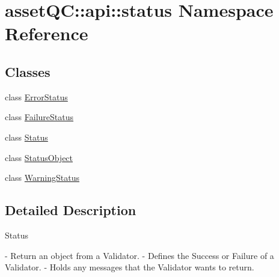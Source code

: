\hypertarget{namespaceassetQC_1_1api_1_1status}{\section{asset\-Q\-C\-:\-:api\-:\-:status \-Namespace \-Reference}
\label{d7/d3f/namespaceassetQC_1_1api_1_1status}
}
\subsection*{\-Classes}
\begin{DoxyCompactItemize}
\item 
class \hyperlink{classassetQC_1_1api_1_1status_1_1ErrorStatus}{\-Error\-Status}
\item 
class \hyperlink{classassetQC_1_1api_1_1status_1_1FailureStatus}{\-Failure\-Status}
\item 
class \hyperlink{classassetQC_1_1api_1_1status_1_1Status}{\-Status}
\item 
class \hyperlink{classassetQC_1_1api_1_1status_1_1StatusObject}{\-Status\-Object}
\item 
class \hyperlink{classassetQC_1_1api_1_1status_1_1WarningStatus}{\-Warning\-Status}
\end{DoxyCompactItemize}


\subsection{\-Detailed \-Description}
\begin{DoxyVerb}
Status

- Return an object from a Validator.
- Defines the Success or Failure of a Validator.
- Holds any messages that the Validator wants to return.
\end{DoxyVerb}
 